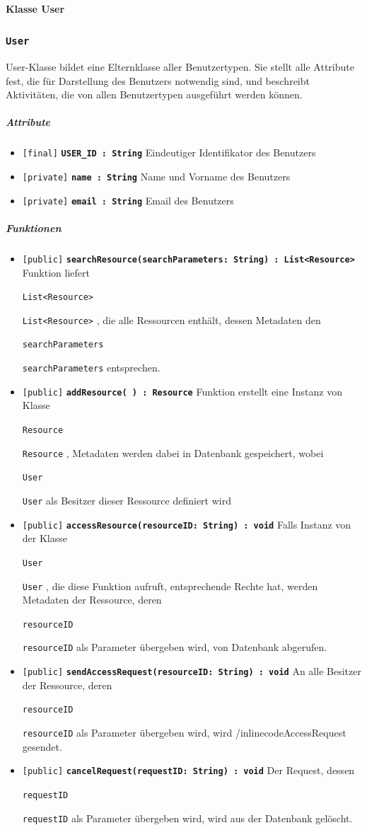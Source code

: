 \documentclass[parskip=full,11pt]{scrartcl}
\makeatletter
\newcommand{\lstInline}[2][,]{%
	\begingroup%
	\lstset{#1}%
	\begin{lrbox}{\mylisting}\lstinline!#2!\end{lrbox}%
	\setlength{\@tempdima}{\linegoal}%
	\ifdim\wd\mylisting>\@tempdima\hfill\\\fi%
	\lstinline!#2!%
	\endgroup%
}
\newcommand{\class}[1]{\subsubsection*{\lstinline[basicstyle=\ttfamily\large]{#1}}}
\newcommand{\atr}[4]{\lstinline{[#3]} \textbf{\lstinline{#1 : #2}} \newline #4}
\newcommand{\mtd}[5]{\lstinline{[#4]} \textbf{\lstinline{#1(#3) : #2}} \newline #5}
\newcommand{\inlinecode}[1]{\lstInline[breaklines=true]{#1}}
\makeatother
\begin{document}
 \paragraph*{Klasse User}
 \class{User}
 User-Klasse bildet eine Elternklasse aller Benutzertypen. Sie stellt alle Attribute fest, die für Darstellung des Benutzers notwendig sind, und beschreibt Aktivitäten, die von allen Benutzertypen ausgeführt werden können.
\subparagraph*{Attribute} %
\begin{itemize}
	\item \atr{USER_ID}{String}{final} {Eindeutiger Identifikator des Benutzers}
	\item \atr{name}{String}{private}{Name und Vorname des Benutzers}	
	\item \atr{email}{String}{private}{Email des Benutzers}
\end{itemize}

\subparagraph*{Funktionen}  %
\begin{itemize}
	\item \mtd{searchResource}{List<Resource>}{searchParameters: String} {public}{Funktion liefert  \inlinecode{List<Resource>}, die alle Ressourcen enthält, dessen Metadaten den \inlinecode{searchParameters} entsprechen.}
	
	\item \mtd{addResource}{Resource}{ }{public}{Funktion erstellt eine Instanz von Klasse \inlinecode{Resource}, Metadaten werden dabei in Datenbank gespeichert, wobei \inlinecode{User} als Besitzer dieser Ressource definiert wird}
	
	\item \mtd{accessResource}{void}{resourceID: String} {public}{Falls Instanz von der Klasse \inlinecode{User}, die diese Funktion aufruft, entsprechende Rechte hat, werden Metadaten der Ressource, deren \inlinecode{resourceID}} als Parameter übergeben wird, von Datenbank abgerufen.
	
	\item \mtd{sendAccessRequest}{void}{resourceID: String} {public}
	{An alle Besitzer der Ressource, deren \inlinecode{resourceID} als Parameter übergeben wird, wird /inlinecode{AccessRequest} gesendet.}
	
	\item \mtd{cancelRequest}{void}{requestID: String} {public}{Der Request, dessen \inlinecode{requestID}} als Parameter übergeben wird, wird aus der Datenbank gelöscht.
\end{itemize}
\end{document}
